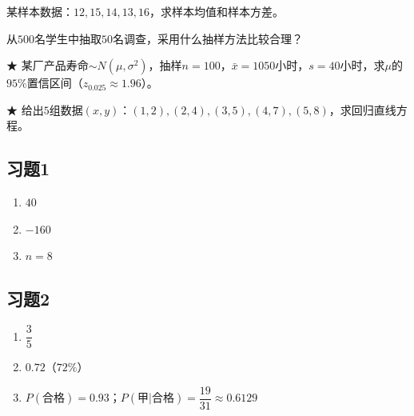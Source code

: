 \documentclass[a4paper,12pt]{ctexart}
\begin{document}




\begin{exercise}
\item 某样本数据：$12,15,14,13,16$，求样本均值和样本方差。
\item 从$500$名学生中抽取$50$名调查，采用什么抽样方法比较合理？
\item ★ 某厂产品寿命$\sim N(\mu,\sigma^2)$，抽样$n=100$，$\bar x=1050$小时，$s=40$小时，求$\mu$的$95\%$置信区间（$z_{0.025}\approx1.96$）。
\item ★ 给出$5$组数据$(x,y)$：$(1,2),(2,4),(3,5),(4,7),(5,8)$，求回归直线方程。
\end{exercise}

\newpage
{}

\subsection*{习题1}
\begin{enumerate}
  \item $40$
  \item $-160$
  \item $n=8$
\end{enumerate}

\subsection*{习题2}
\begin{enumerate}
  \item $\dfrac35$
  \item $0.72$（$72\%$）
  \item $P(\text{合格})=0.93$；$P(\text{甲}|\text{合格})=\dfrac{19}{31}\approx0.6129$
\end{enumerate}
\end{document}
